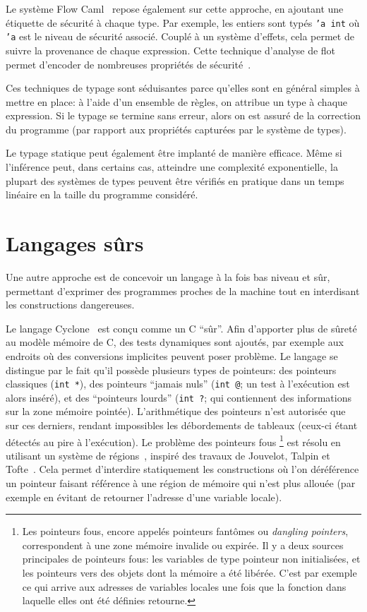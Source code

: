 Le système Flow Caml~\cite{flowcaml} repose également sur cette approche, en
ajoutant une étiquette de sécurité à chaque type. Par exemple, les entiers sont
typés \texttt{'a int} où \texttt{'a} est le niveau de sécurité associé. Couplé à
un système d'effets, cela permet de suivre la provenance de chaque expression.
Cette technique d'analyse de flot permet d'encoder de nombreuses propriétés de
sécurité~\cite{sm-jsac03}.

Ces techniques de typage sont séduisantes parce qu'elles sont en général simples
à mettre en place: à l'aide d'un ensemble de règles, on attribue un type à
chaque expression. Si le typage se termine sans erreur, alors on est assuré de
la correction du programme (par rapport aux propriétés capturées par le système
de types).

Le typage statique peut également être implanté de manière efficace. Même si
l'inférence peut, dans certains cas, atteindre une complexité exponentielle, la
plupart des systèmes de types peuvent être vérifiés en pratique dans un temps
linéaire en la taille du programme considéré.


\section{Langages sûrs}

Une autre approche est de concevoir un langage à la fois bas niveau et sûr,
permettant d'exprimer des programmes proches de la machine tout en interdisant
les constructions dangereuses.

Le langage Cyclone~\cite{cyclone-safety} est conçu comme un C \enquote{sûr}.
Afin d'apporter plus de sûreté au modèle mémoire de C, des tests dynamiques sont
ajoutés, par exemple aux endroits où des conversions implicites peuvent poser
problème. Le langage se distingue par le fait qu'il possède plusieurs types de
pointeurs: des pointeurs classiques (\texttt{int *}), des pointeurs
\enquote{jamais nuls} (\texttt{int @}; un test à l'exécution est alors inséré),
et des \enquote{pointeurs lourds} (\verb!int ?!; qui contiennent des
informations sur la zone mémoire pointée). L'arithmétique des pointeurs n'est
autorisée que sur ces derniers, rendant impossibles les débordements de tableaux
(ceux-ci étant détectés au pire à l'exécution). Le problème des pointeurs fous
\footnote{
    Les pointeurs fous, encore appelés pointeurs fantômes ou \emph{dangling
    pointers}, correspondent à une zone mémoire invalide ou expirée. Il y a deux
    sources principales de pointeurs fous: les variables de type pointeur non
    initialisées, et les pointeurs vers des objets dont la mémoire a été libérée.
    C'est par exemple ce qui arrive aux adresses de variables locales une fois
    que la fonction dans laquelle elles ont été définies retourne.
}
est résolu en utilisant un système de régions~\cite{cyclone-regions}, inspiré
des travaux de Jouvelot, Talpin et \linebreak
Tofte~\cite{jfp92,ToTa1993,popl94}. Cela permet d'interdire statiquement les
constructions où l'on déréférence un pointeur faisant référence à une région de
mémoire qui n'est plus allouée (par exemple en évitant de retourner l'adresse
d'une variable locale).

